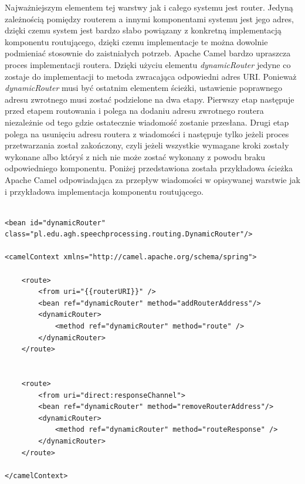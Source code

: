 Najważniejszym elementem tej warstwy jak i całego systemu jest router. Jedyną zależnością pomiędzy routerem a innymi komponentami systemu jest jego adres, dzięki czemu system jest bardzo słabo powiązany z konkretną implementacją komponentu routującego, dzięki czemu implementacje te można dowolnie podmieniać stosownie do zaistniałych potrzeb. Apache Camel bardzo upraszcza proces implementacji routera. Dzięki użyciu elementu \textit{dynamicRouter} jedyne co zostaje do implementacji to metoda zwracająca odpowiedni adres URI. Ponieważ \textit{dynamicRouter} musi być ostatnim elementem ścieżki, ustawienie poprawnego adresu zwrotnego musi zostać podzielone na dwa etapy. Pierwszy etap następuje przed etapem routowania i polega na dodaniu adresu zwrotnego routera niezależnie od tego gdzie ostatecznie wiadomość zostanie przesłana. Drugi etap polega na usunięciu adresu routera z wiadomości i następuje tylko jeżeli proces przetwarzania został zakończony, czyli jeżeli wszystkie wymagane kroki zostały wykonane albo któryś z nich nie może zostać wykonany z powodu braku odpowiedniego komponentu. Poniżej przedstawiona została przykładowa ścieżka Apache Camel odpowiadająca za przepływ wiadomości w opisywanej warstwie jak i przykładowa implementacja komponentu routującego.


\begin{center}
\begin{lstlisting}

<bean id="dynamicRouter" class="pl.edu.agh.speechprocessing.routing.DynamicRouter"/>

<camelContext xmlns="http://camel.apache.org/schema/spring">

	<route>
		<from uri="{{routerURI}}" />
		<bean ref="dynamicRouter" method="addRouterAddress"/>
		<dynamicRouter>
			<method ref="dynamicRouter" method="route" />
		</dynamicRouter>
	</route>


	<route>
		<from uri="direct:responseChannel">
		<bean ref="dynamicRouter" method="removeRouterAddress"/>
		<dynamicRouter>
			<method ref="dynamicRouter" method="routeResponse" />
		</dynamicRouter>
	</route>

</camelContext>

\end{lstlisting}
\end{center}

